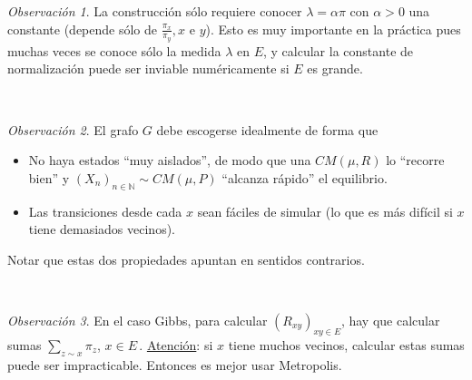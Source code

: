 \documentclass[letterpaper,11pt]{article} %
\theoremstyle{defbreak}
\theoremstyle{propbreak}
\theoremstyle{remark}
\newtheorem{remark}{Observación}[subsection]
\theoremstyle{break}
\def\N{\mathbb{N}}
\begin{document}
\begin{remark}
La construcción sólo requiere conocer $\lambda = \alpha \pi$ con $\alpha>0$ una constante (depende sólo de $\displaystyle \frac{\pi_x}{\pi_y},x$ e $y$). %
Esto es muy importante en la práctica pues muchas veces se conoce sólo la medida $\lambda$ en $E$, y calcular la constante de normalización puede ser inviable numéricamente si $E$ es grande.
\end{remark}
\vspace{.5cm} \\ %
\begin{remark}
El grafo $G$ debe escogerse idealmente de forma que
\begin{itemize}
    \item No haya estados ``muy aislados'', de modo que una $CM(\mu,R)$ lo ``recorre bien'' y $(X_n)_{n\in\N}\sim CM(\mu,P)$ ``alcanza rápido'' el equilibrio.
    \item Las transiciones desde cada $x$ sean fáciles de simular (lo que es m\'as difícil si $x$ tiene demasiados vecinos).
\end{itemize}
Notar que estas dos propiedades apuntan  en sentidos contrarios.
\end{remark}
\vspace{.5cm} \\ %
\begin{remark}  %
En el caso Gibbs,  para calcular $(R_{xy})_{xy\in E}$, hay que calcular sumas $\sum_{z\sim x}\pi_z$, $x\in E$\,.
    \newline \underline{Atención}: si $x$ tiene muchos vecinos, calcular estas sumas puede ser impracticable. Entonces es mejor usar Metropolis.
\end{remark}
\end{document}
